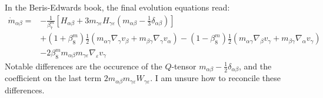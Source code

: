 \documentclass[reqno]{article}
\begin{document}
  In the Beris-Edwards book, the final evolution equations read:
  \begin{equation}
    \begin{split}
      \dot{m}_{\alpha\beta}
      =
      &-\frac{1}{\beta^m_7}
      \left[
        H_{\alpha\beta}
        + 3m_{\gamma\varepsilon} H_{\gamma\varepsilon} \left( m_{\alpha\beta} - \frac13 \delta_{\alpha\beta} \right)
      \right] \\
      &+ \left( 1 + \beta^m_8 \right) \tfrac12 \left( m_{\alpha\gamma} \nabla_\gamma v_\beta + m_{\beta\gamma} \nabla_\gamma v_\alpha \right)
      - \left( 1 - \beta^m_8 \right) \tfrac12 \left( m_{\alpha\gamma} \nabla_\beta v_\gamma + m_{\beta\gamma} \nabla_\alpha v_\gamma \right) \\
      &- 2\beta^m_8 m_{\alpha\beta} m_{\gamma\varepsilon} \nabla_\varepsilon v_\gamma
    \end{split}
  \end{equation}
  Notable differences are the occurence of the $Q$-tensor $m_{\alpha\beta} -
  \tfrac12 \delta_{\alpha\beta}$, and the coefficient on the last term $2
  m_{\alpha\beta} m_{\gamma\varepsilon} W_{\gamma\varepsilon}$.
  I am unsure how to reconcile these differences.

	
\end{document}

